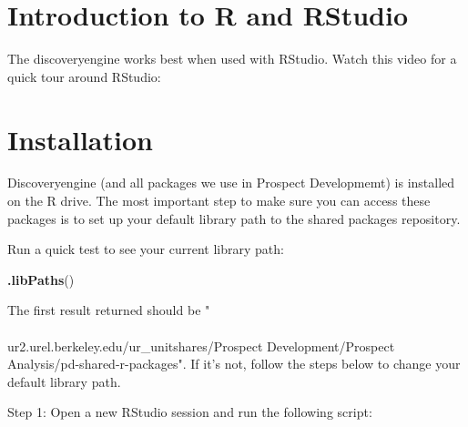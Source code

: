 \documentclass[]{book}
\newenvironment{Shaded}{\begin{snugshade}}{\end{snugshade}}
\newcommand{\KeywordTok}[1]{\textcolor[rgb]{0.13,0.29,0.53}{\textbf{#1}}}
\newcommand{\NormalTok}[1]{#1}
\begin{document}
\hypertarget{r-intro}{%
\chapter{Introduction to R and RStudio}\label{r-intro}}

The discoveryengine works best when used with RStudio. Watch this video for a quick tour around RStudio:

\hypertarget{installation}{%
\chapter{Installation}\label{installation}}

Discoveryengine (and all packages we use in Prospect Developmemt) is installed on the R drive. The most important step to make sure you can access these packages is to set up your default library path to the shared packages repository.

Run a quick test to see your current library path:

\begin{Shaded}
\begin{Highlighting}[]
\KeywordTok{.libPaths}\NormalTok{()}
\end{Highlighting}
\end{Shaded}

The first result returned should be "\\\\ur2.urel.berkeley.edu/ur_unitshares/Prospect Development/Prospect Analysis/pd-shared-r-packages". If it's not, follow the steps below to change your default library path.

Step 1: Open a new RStudio session and run the following script:
\end{document}

